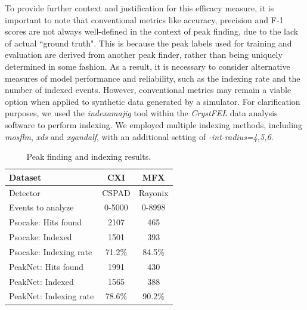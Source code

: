 \documentclass[conference]{IEEEtran}
\newcommand{\peaknet}{PeakNet}
\newcommand{\psocake}{Psocake}
\begin{document}
To provide further context and justification for this efficacy measure, it is
important to note that conventional metrics like accuracy, precision and F-1
scores are not always well-defined in the context of peak finding, due to the
lack of actual ``ground truth".  This is because the peak labels used for
training and evaluation are derived from another peak finder, rather than being
uniquely determined in some fashion.  As a result, it is necessary to consider
alternative measures of model performance and reliability, such as the indexing
rate and the number of indexed events.  However, conventional metrics may remain
a viable option when applied to synthetic data generated by a simulator.   For
clarification purposes, we used the \textit{indexamajig} tool within the
\textit{CrystFEL} data analysis software \citep{whiteCrystFELSoftwareSuite2012}
to perform indexing.  We employed multiple indexing methods, including
\textit{mosflm}, \textit{xds} and \textit{xgandalf}, with an additional setting
of \textit{-int-radius=4,5,6}.   

\begin{table}[htbp]
\caption{
    Peak finding and indexing results.
}
\label{tb : perf}
\centering
\begin{tabular}{ | l || c | c | }
    \hline
    Dataset           &  CXI   & MFX\\
    \hline
    Detector          & CSPAD  & Rayonix \\
    Events to analyze & 0-5000 & 0-8998 \\
    \hline
    \psocake{}: Hits found         &  2107   & 465  \\
    \psocake{}: Indexed       &  1501   & 393  \\
    \psocake{}: Indexing rate &  71.2\% & 84.5\% \\
    \hline
    \peaknet{}: Hits found         &  1991   & 430  \\
    \peaknet{}: Indexed       &  1565   & 388  \\
    \peaknet{}: Indexing rate &  78.6\% & 90.2\% \\
    \hline
\end{tabular}
\end{table}
\end{document}
